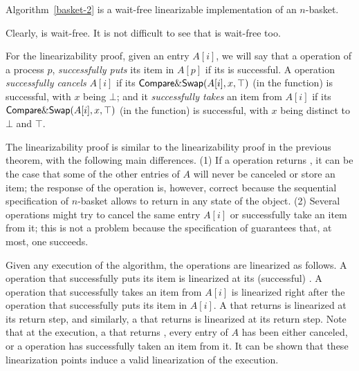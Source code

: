 \begin{theorem}\label{theorem:N-basket}
Algorithm~\ref{basket-2} is a wait-free linearizable implementation of an $n$-basket.
\end{theorem}

\begin{proofT}
Clearly, \Put is wait-free. It is not difficult to see that \Take is wait-free too.

For the linearizability proof, given an entry $A[i]$, we will say that a \Put operation of a process $p$, \emph{successfully puts} its item in $A[p]$ if its \CAS is successful. A \Take operation \emph{successfully cancels} $A[i]$ if its ${\sf Compare\&Swap}(A[i], x, \top)$ (in the \compete function) is successful, with $x$ being $\bot$; and it \emph{successfully takes} an item from $A[i]$ if its ${\sf Compare\&Swap}(A[i], x, \top)$ (in the \compete function) is successful, with $x$ being distinct to $\bot$ and $\top$.

The linearizability proof is similar to the linearizability proof in the previous theorem, with the following main differences. (1) If a \Put operation returns \full, it can be the case that some of the other entries of $A$ will never be canceled or store an item; the response of the \Put operation is, however, correct because the sequential specification of $n$-basket allows \Put to return \full in any state of the object. (2) Several \Take operations might try to cancel the same entry $A[i]$ or successfully take an item from it; this is not a problem because the specification of \CAS guarantees that, at most, one succeeds.

Given any execution of the algorithm, the operations are linearized as follows. A \Put operation that successfully puts its item is linearized at its (successful) \CAS. A \Take operation that successfully takes an item from $A[i]$ is linearized right after the \Put operation that successfully puts its item in $A[i]$. A \Put that returns \full is linearized at its return step, and similarly, a \Take that returns \closed is linearized at its return step. Note that at the execution, a \Take that returns \closed, every entry of $A$ has been either canceled, or a \Take operation has successfully taken an item from it. It can be shown that these linearization points induce a valid linearization of the execution.
\end{proofT}

